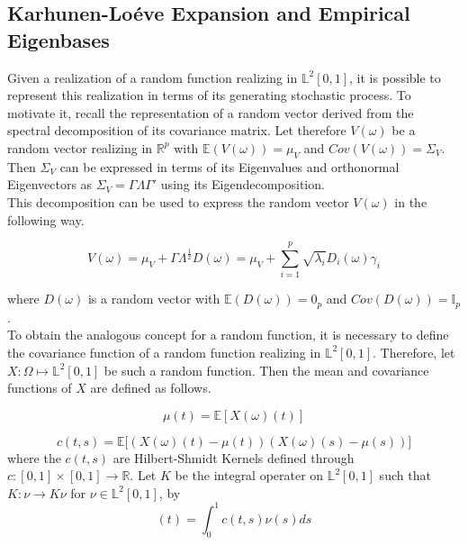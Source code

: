 \documentclass[11pt,twoside,a4paper]{article}
\begin{document}
	\subsection{Karhunen-Lo\'{e}ve Expansion and Empirical Eigenbases}\hypertarget{KL}{}
	Given a realization of a random function realizing in $\mathbb{L}^2[0,1]$, it is possible to represent this realization in terms of its generating stochastic process. To motivate it, recall the representation of a random vector derived from the spectral decomposition of its covariance matrix. Let therefore $V(\omega)$ be a random vector realizing in $\mathbb{R}^{p}$ with $\mathbb{E}(V(\omega)) = \mu_V$ and $Cov(V(\omega)) = \Sigma_V$. Then $\Sigma_V$ can be expressed in terms of its Eigenvalues and orthonormal Eigenvectors as $\Sigma_V = \Gamma \Lambda \Gamma'$ using its Eigendecomposition.\\
	
	This decomposition can be used to express the random vector $V(\omega)$ in the following way.
	
	\begin{equation}
		V(\omega) = \mu_V + \Gamma \Lambda^{\frac{1}{2}} D(\omega) = \mu_V + \sum_{i = 1}^{p} \sqrt{\lambda_i} D_i(\omega) \gamma_i
	\end{equation}
	
	where $D(\omega)$ is a random vector with $\mathbb{E}(D(\omega)) = 0_p$ and $Cov(D(\omega)) = \mathbb{I}_p$.\\
	
	To obtain the analogous concept for a random function, it is necessary to define the covariance function of a random function realizing in $\mathbb{L}^2[0,1]$. Therefore, let $X: \Omega \mapsto \mathbb{L}^2[0,1]$ be such a random function.
	Then the mean and covariance functions of $X$ are defined as follows.
	
	\begin{equation}\label{MeanFunction}
		\mu(t) = \mathbb{E}\left[ X(\omega)(t) \right]
	\end{equation}
	
	\begin{equation}\label{CovarianceFunction}
		c(t,s) = \mathbb{E}\big[ \left( X(\omega)(t) - \mu(t) \right) \left( X(\omega)(s) - \mu(s) \right) \big]
	\end{equation}
	where the $c(t,s)$ are Hilbert-Shmidt Kernels defined through $c : [0,1] \times [0,1] \rightarrow \mathbb{R}$. Let $K$ be the integral operater on $\mathbb{L}^{2}[0,1]$ such that $K : \nu \rightarrow K \nu$ for $\nu \in \mathbb{L}^{2}[0,1]$, by
	\begin{equation}
		[K \nu](t) = \int_{0}^{1}c(t,s) \nu(s)ds
	\end{equation}
	
\end{document}
